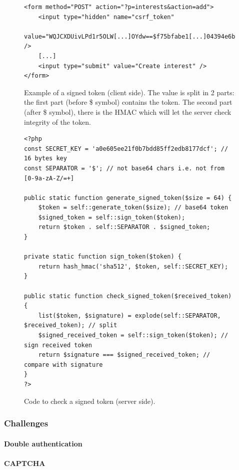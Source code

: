 \documentclass[a4paper,11pt,openany]{report}
\begin{document}
  \begin{figure}[h!t]
  \begin{verbatim}
<form method="POST" action="?p=interests&action=add">
    <input type="hidden" name="csrf_token" 
        value="WQJCXDUivLPd1r5OLW[...]OYdw==$f75bfabe1[...]04394e6b" />
    [...]
    <input type="submit" value="Create interest" />
</form>
  \end{verbatim}
  \caption{Example of a signed token (client side). The value is split in 2 parts: the first part 
  (before \$ symbol) contains the token. The second part (after \$ symbol), there is the HMAC which 
  will let the server check integrity of the token.}
  \label{figure:signed_token_client}
  \end{figure}
  
  \begin{figure}[h!t]
  \begin{verbatim}
<?php
const SECRET_KEY = 'a0e605ee21f0b7bdd85ff2edb8177dcf'; // 16 bytes key
const SEPARATOR = '$'; // not base64 chars i.e. not from [0-9a-zA-Z/=+]

public static function generate_signed_token($size = 64) {
    $token = self::generate_token($size); // base64 token
    $signed_token = self::sign_token($token);
    return $token . self::SEPARATOR . $signed_token;
}

private static function sign_token($token) {
    return hash_hmac('sha512', $token, self::SECRET_KEY);
}
  
public static function check_signed_token($received_token) {
    list($token, $signature) = explode(self::SEPARATOR, $received_token); // split
    $signed_received_token = self::sign_token($token); // sign received token
    return $signature === $signed_received_token; // compare with signature
}
?>
  \end{verbatim}
  \caption{Code to check a signed token (server side).}
  \label{figure:signed_token_server}
  \end{figure}
  
  \subsubsection{Challenges}
  
  \paragraph{Double authentication}
  
  \paragraph{CAPTCHA}
  
\end{document}
